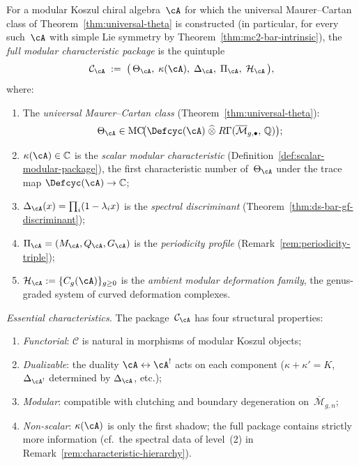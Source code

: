 \begin{definition}
\label{def:full-modular-package}
For a modular Koszul chiral algebra~$\cA$ for which the universal
Maurer--Cartan class of Theorem~\ref{thm:universal-theta} is
constructed (in particular, for every such~$\cA$ with simple Lie
symmetry by Theorem~\ref{thm:mc2-bar-intrinsic}), the
\emph{full modular characteristic package} is the quintuple
\begin{equation}\label{eq:full-package-quintuple}
\mathcal{C}_{\cA}
\;:=\;
\bigl(\,\Theta_{\cA},\;\kappa(\cA),\;\Delta_{\cA},\;
       \Pi_{\cA},\;\mathcal{H}_{\cA}\,\bigr),
\end{equation}
where:
\begin{enumerate}[label=\textup{(\roman*)}]
\item The \emph{universal Maurer--Cartan class}
  (Theorem~\ref{thm:universal-theta}):
  \[
  \Theta_{\cA} \in
  \operatorname{MC}\!\bigl(
    \Defcyc(\cA) \;\widehat{\otimes}\;
    R\Gamma(\overline{\mathcal{M}}_{g,\bullet},\, \mathbb{Q})
  \bigr);
  \]
\item $\kappa(\cA) \in \mathbb{C}$ is the
  \emph{scalar modular characteristic}
  (Definition~\ref{def:scalar-modular-package}),
  the first characteristic number of~$\Theta_{\cA}$
  under the trace map
  $\Defcyc(\cA) \to \mathbb{C}$;
\item $\Delta_{\cA}(x) = \prod_{i}(1 - \lambda_i x)$ is the
  \emph{spectral discriminant}
  (Theorem~\ref{thm:ds-bar-gf-discriminant});
\item $\Pi_{\cA} = (M_{\cA}, Q_{\cA}, G_{\cA})$ is the
  \emph{periodicity profile}
  (Remark~\ref{rem:periodicity-triple});
\item $\mathcal{H}_{\cA} := \{C_g(\cA)\}_{g \geq 0}$ is the
  \emph{ambient modular deformation family}, the genus-graded
  system of curved deformation complexes.
\end{enumerate}

\smallskip\noindent
\emph{Essential characteristics.}
The package~$\mathcal{C}_{\cA}$ has four structural properties:
\begin{enumerate}[label=\textup{(\alph*)}]
\item \emph{Functorial}: $\mathcal{C}$ is natural in morphisms
  of modular Koszul objects;
\item \emph{Dualizable}: the duality $\cA \leftrightarrow \cA^!$
  acts on each component
  ($\kappa + \kappa' = K$, $\Delta_{\cA^!}$ determined by
  $\Delta_{\cA}$, etc.);
\item \emph{Modular}: compatible with clutching and
  boundary degeneration on~$\overline{\mathcal{M}}_{g,n}$;
\item \emph{Non-scalar}: $\kappa(\cA)$ is only the first shadow;
  the full package contains strictly more information
  (cf.\ the spectral data of level~(2) in
  Remark~\ref{rem:characteristic-hierarchy}).
\end{enumerate}


\end{definition}
